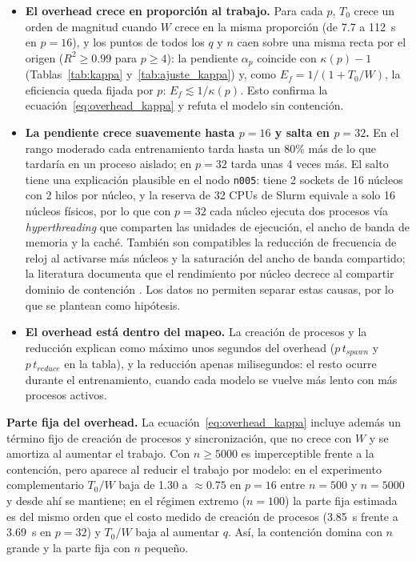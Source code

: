 \documentclass[11pt, a4paper]{article}
\begin{document}
\begin{itemize}
    \item \textbf{El overhead crece en proporción al trabajo.} Para cada $p$, $T_0$ crece un orden de magnitud cuando $W$ crece en la misma proporción (de 7.7 a 112~s en $p=16$), y los puntos de todos los $q$ y $n$ caen sobre una misma recta por el origen ($R^2 \ge 0.99$ para $p \ge 4$): la pendiente $\alpha_p$ coincide con $\kappa(p)-1$ (Tablas~\ref{tab:kappa} y~\ref{tab:ajuste_kappa}) y, como $E_f = 1/(1+T_0/W)$, la eficiencia queda fijada por $p$: $E_f \lesssim 1/\kappa(p)$. Esto confirma la ecuación~\eqref{eq:overhead_kappa} y refuta el modelo sin contención.
    \item \textbf{La pendiente crece suavemente hasta $p = 16$ y salta en $p = 32$.} En el rango moderado cada entrenamiento tarda hasta un 80\% más de lo que tardaría en un proceso aislado; en $p = 32$ tarda unas 4 veces más. El salto tiene una explicación plausible en el nodo \texttt{n005}: tiene 2 sockets de 16 núcleos con 2 hilos por núcleo, y la reserva de 32 CPUs de Slurm equivale a solo 16 núcleos físicos, por lo que con $p = 32$ cada núcleo ejecuta dos procesos vía \textit{hyperthreading} que comparten las unidades de ejecución, el ancho de banda de memoria y la caché. También son compatibles la reducción de frecuencia de reloj al activarse más núcleos y la saturación del ancho de banda compartido; la literatura documenta que el rendimiento por núcleo decrece al compartir dominio de contención \cite{afzal2020bandwidth}. Los datos no permiten separar estas causas, por lo que se plantean como hipótesis.
    \item \textbf{El overhead está dentro del mapeo.} La creación de procesos y la reducción explican como máximo unos segundos del overhead ($p\,t_{spawn}$ y $p\,t_{reduce}$ en la tabla), y la reducción apenas milisegundos: el resto ocurre durante el entrenamiento, cuando cada modelo se vuelve más lento con más procesos activos.
\end{itemize}

\textbf{Parte fija del overhead.} La ecuación~\eqref{eq:overhead_kappa} incluye además un término fijo de creación de procesos y sincronización, que no crece con $W$ y se amortiza al aumentar el trabajo. Con $n \ge 5000$ es imperceptible frente a la contención, pero aparece al reducir el trabajo por modelo: en el experimento complementario $T_0/W$ baja de 1.30 a $\approx 0.75$ en $p = 16$ entre $n = 500$ y $n = 5000$ y desde ahí se mantiene; en el régimen extremo ($n = 100$) la parte fija estimada es del mismo orden que el costo medido de creación de procesos (3.85~s frente a 3.69~s en $p = 32$) y $T_0/W$ baja al aumentar $q$. Así, la contención domina con $n$ grande y la parte fija con $n$ pequeño.
\end{document}
